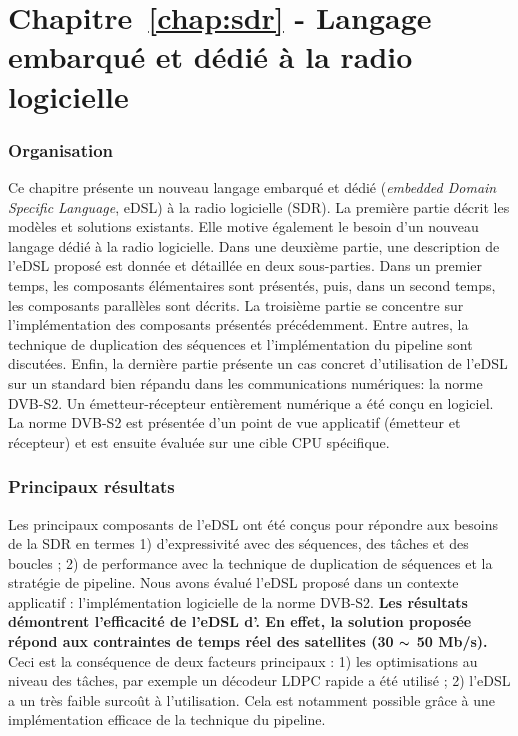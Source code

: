 \section*{Chapitre~\ref{chap:sdr} - Langage embarqué et dédié à la radio logicielle}

\subsubsection*{Organisation}

Ce chapitre présente un nouveau langage embarqué et dédié (\emph{embedded Domain
Specific Language}, eDSL) à la radio logicielle (SDR). La première partie
décrit les modèles et solutions existants. Elle motive également le besoin
d'un nouveau langage dédié à la radio logicielle. Dans une deuxième partie, une
description de l'eDSL proposé est donnée et détaillée en deux sous-parties. Dans
un premier temps, les composants élémentaires sont présentés, puis, dans un
second temps, les composants parallèles sont décrits. La troisième partie se
concentre sur l'implémentation des composants présentés précédemment. Entre
autres, la technique de duplication des séquences et l'implémentation du
pipeline sont discutées. Enfin, la dernière partie présente un cas concret
d'utilisation de l'eDSL sur un standard bien répandu dans les communications
numériques: la norme DVB-S2. Un émetteur-récepteur entièrement numérique a été
conçu en logiciel. La norme DVB-S2 est présentée d'un point de vue applicatif
(émetteur et récepteur) et est ensuite évaluée sur une cible CPU spécifique.

\subsubsection*{Principaux résultats}

Les principaux composants de l'eDSL ont été conçus pour répondre aux besoins de
la SDR en termes 1) d'expressivité avec des séquences, des tâches et des
boucles ; 2) de performance avec la technique de duplication de séquences et la
stratégie de pipeline. Nous avons évalué l'eDSL proposé dans un contexte
applicatif : l'implémentation logicielle de la norme DVB-S2. \textbf{Les
résultats démontrent l'efficacité de l'eDSL d'\AFFECT. En effet, la solution
proposée répond aux contraintes de temps réel des satellites (30 $\thicksim$
50 Mb/s).} Ceci est la conséquence de deux facteurs principaux : 1) les
optimisations au niveau des tâches, par exemple un décodeur LDPC rapide a été
utilisé ; 2) l'eDSL a un très faible surcoût à l'utilisation. Cela est notamment
possible grâce à une implémentation efficace de la technique du pipeline.
